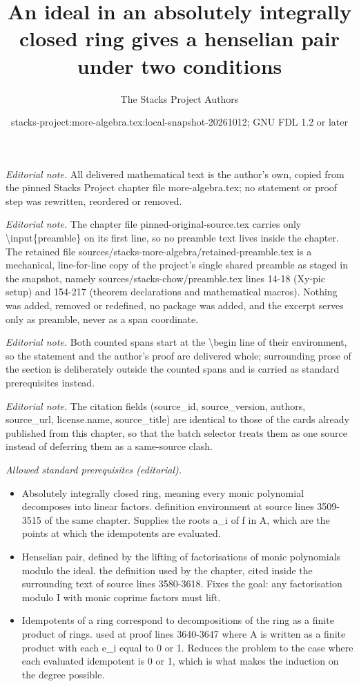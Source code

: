 \documentclass[10pt,a4paper]{amsart}
\title{An ideal in an absolutely integrally closed ring gives a henselian pair under two conditions}
\author{The Stacks Project Authors}
\date{stacks-project:more-algebra.tex:local-snapshot-20261012; GNU FDL 1.2 or later}
\theoremstyle{plain}
\theoremstyle{definition}
\theoremstyle{remark}
\numberwithin{equation}{subsection}
\begin{document}
\maketitle
\setcounter{subsection}{1}
\noindent\textit{Editorial note.} All delivered mathematical text is the author's own, copied from the pinned Stacks Project chapter file more-algebra.tex; no statement or proof step was rewritten, reordered or removed.\par\medskip
\noindent\textit{Editorial note.} The chapter file pinned-original-source.tex carries only \textbackslash{}input\{preamble\} on its first line, so no preamble text lives inside the chapter. The retained file sources/stacks-more-algebra/retained-preamble.tex is a mechanical, line-for-line copy of the project's single shared preamble as staged in the snapshot, namely sources/stacks-chow/preamble.tex lines 14-18 (Xy-pic setup) and 154-217 (theorem declarations and mathematical macros). Nothing was added, removed or redefined, no package was added, and the excerpt serves only as preamble, never as a span coordinate.\par\medskip
\noindent\textit{Editorial note.} Both counted spans start at the \textbackslash{}begin line of their environment, so the statement and the author's proof are delivered whole; surrounding prose of the section is deliberately outside the counted spans and is carried as standard prerequisites instead.\par\medskip
\noindent\textit{Editorial note.} The citation fields (source\_id, source\_version, authors, source\_url, license.name, source\_title) are identical to those of the cards already published from this chapter, so that the batch selector treats them as one source instead of deferring them as a same-source clash.\par\medskip
\noindent\textit{Allowed standard prerequisites (editorial).}\begin{itemize}
\item Absolutely integrally closed ring, meaning every monic polynomial decomposes into linear factors. definition environment at source lines 3509-3515 of the same chapter. Supplies the roots a\_i of f in A, which are the points at which the idempotents are evaluated.
\item Henselian pair, defined by the lifting of factorisations of monic polynomials modulo the ideal. the definition used by the chapter, cited inside the surrounding text of source lines 3580-3618. Fixes the goal: any factorisation modulo I with monic coprime factors must lift.
\item Idempotents of a ring correspond to decompositions of the ring as a finite product of rings. used at proof lines 3640-3647 where A is written as a finite product with each e\_i equal to 0 or 1. Reduces the problem to the case where each evaluated idempotent is 0 or 1, which is what makes the induction on the degree possible.
\end{itemize}\medskip
\end{document}
